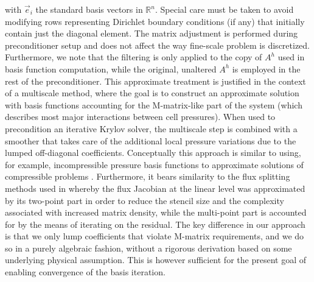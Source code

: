 with $\vec{e}_i$ the standard basis vectors in $\mathbb{R}^n$.   Special care must be taken to avoid modifying rows representing Dirichlet boundary conditions (if any) that initially contain just the diagonal element.   The matrix adjustment is performed during preconditioner setup and does not affect the way fine-scale problem is discretized.   Furthermore, we note that the filtering is only applied to the copy of $A^h$ used in basis function computation, while the original, unaltered $A^h$ is employed in the rest of the preconditioner.   This approximate treatment is justified in the context of a multiscale method, where the goal is to construct an approximate solution with basis functions accounting for the M-matrix-like part of the system (which describes most major interactions between cell pressures).   When used to precondition an iterative Krylov solver, the multiscale step is combined with a smoother that takes care of the additional local pressure variations due to the lumped off-diagonal coefficients.   Conceptually this approach is similar to using, for example, incompressible pressure basis functions to approximate solutions of compressible problems \cite{Zhou2008}.   Furthermore, it bears similarity to the flux splitting methods used in \cite{Lee2002,Jenny2002} whereby the flux Jacobian at the linear level was approximated by its two-point part in order to reduce the stencil size and the complexity associated with increased matrix density, while the multi-point part is accounted for by the means of iterating on the residual.   The key difference in our approach is that we only lump coefficients that violate M-matrix requirements, and we do so in a purely algebraic fashion, without a rigorous derivation based on some underlying physical assumption.   This is however sufficient for the present goal of enabling convergence of the basis iteration.

